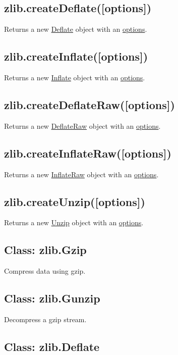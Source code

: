 \subsection{zlib.createDeflate({[}options{]})}

Returns a new \hyperref[zlib_class_zlib_deflate]{Deflate} object with
an \hyperref[zlib_options]{options}.

\subsection{zlib.createInflate({[}options{]})}

Returns a new \hyperref[zlib_class_zlib_inflate]{Inflate} object with
an \hyperref[zlib_options]{options}.

\subsection{zlib.createDeflateRaw({[}options{]})}

Returns a new \hyperref[zlib_class_zlib_deflateraw]{DeflateRaw}
object with an \hyperref[zlib_options]{options}.

\subsection{zlib.createInflateRaw({[}options{]})}

Returns a new \hyperref[zlib_class_zlib_inflateraw]{InflateRaw}
object with an \hyperref[zlib_options]{options}.

\subsection{zlib.createUnzip({[}options{]})}

Returns a new \hyperref[zlib_class_zlib_unzip]{Unzip} object with an
\hyperref[zlib_options]{options}.

\subsection{Class: zlib.Gzip}

Compress data using gzip.

\subsection{Class: zlib.Gunzip}

Decompress a gzip stream.

\subsection{Class: zlib.Deflate}

